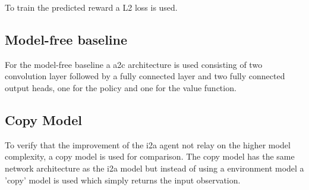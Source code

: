 To train the predicted reward a L2 loss is used.\\
 
\subsection{Model-free baseline}

For the model-free baseline a a2c architecture is used consisting of two convolution layer followed by a fully connected layer and two fully connected output heads, one for the policy and one for the value function.\\

\subsection{Copy Model}

To verify that the improvement of the i2a agent not relay on the higher model complexity, a copy model is used for comparison. The copy model has the same network architecture as the i2a model but instead of using a environment model a 'copy' model is used which simply returns the input observation. 